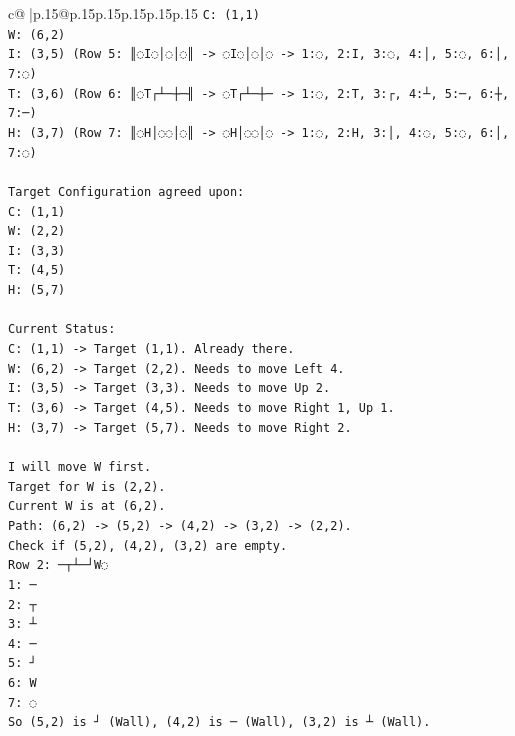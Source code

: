 \documentclass{article}
\begin{document}
{\begin{supertabular}{c@{$\;$}|p{.15\linewidth}@{}p{.15\linewidth}p{.15\linewidth}p{.15\linewidth}p{.15\linewidth}p{.15\linewidth}}
{{{\texttt{C: (1,1)} \\
\texttt{W: (6,2)} \\
\texttt{I: (3,5) (Row 5: ║◌I◌│◌│◌║ {-}> ◌I◌│◌│◌ {-}> 1:◌, 2:I, 3:◌, 4:│, 5:◌, 6:│, 7:◌)} \\
\texttt{T: (3,6) (Row 6: ║◌T┌┴─┼─╢ {-}> ◌T┌┴─┼─ {-}> 1:◌, 2:T, 3:┌, 4:┴, 5:─, 6:┼, 7:─)} \\
\texttt{H: (3,7) (Row 7: ║◌H│◌◌│◌║ {-}> ◌H│◌◌│◌ {-}> 1:◌, 2:H, 3:│, 4:◌, 5:◌, 6:│, 7:◌)} \\
\\ 
\texttt{Target Configuration agreed upon:} \\
\texttt{C: (1,1)} \\
\texttt{W: (2,2)} \\
\texttt{I: (3,3)} \\
\texttt{T: (4,5)} \\
\texttt{H: (5,7)} \\
\\ 
\texttt{Current Status:} \\
\texttt{C: (1,1) {-}> Target (1,1). Already there.} \\
\texttt{W: (6,2) {-}> Target (2,2). Needs to move Left 4.} \\
\texttt{I: (3,5) {-}> Target (3,3). Needs to move Up 2.} \\
\texttt{T: (3,6) {-}> Target (4,5). Needs to move Right 1, Up 1.} \\
\texttt{H: (3,7) {-}> Target (5,7). Needs to move Right 2.} \\
\\ 
\texttt{I will move W first.} \\
\texttt{Target for W is (2,2).} \\
\texttt{Current W is at (6,2).} \\
\texttt{Path: (6,2) {-}> (5,2) {-}> (4,2) {-}> (3,2) {-}> (2,2).} \\
\texttt{Check if (5,2), (4,2), (3,2) are empty.} \\
\texttt{Row 2: ─┬┴─┘W◌} \\
\texttt{1: ─} \\
\texttt{2: ┬} \\
\texttt{3: ┴} \\
\texttt{4: ─} \\
\texttt{5: ┘} \\
\texttt{6: W} \\
\texttt{7: ◌} \\
\texttt{So (5,2) is ┘ (Wall), (4,2) is ─ (Wall), (3,2) is ┴ (Wall).} \\
}}}
\end{supertabular}}
\end{document}
